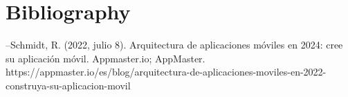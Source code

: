 \documentclass{article}
\begin{document}
\section{Bibliography}
--Schmidt, R. (2022, julio 8). Arquitectura de aplicaciones móviles en 2024: cree su aplicación móvil. Appmaster.io; AppMaster. https://appmaster.io/es/blog/arquitectura-de-aplicaciones-moviles-en-2022-construya-su-aplicacion-movil
\end{document}
